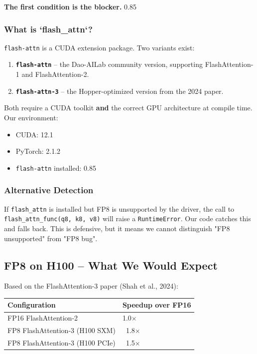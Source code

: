 \textbf{The first condition is the blocker.} 0.85

\subsubsection{What is `flash\_attn`?}

\texttt{flash-attn} is a CUDA extension package. Two variants exist:

\begin{enumerate}
\item \textbf{\texttt{flash-attn}} -- the Dao-AILab community version, supporting
  FlashAttention-1 and FlashAttention-2.
\item \textbf{\texttt{flash-attn-3}} -- the Hopper-optimized version from the 2024 paper.

\end{enumerate}
Both require a CUDA toolkit \textbf{and} the correct GPU architecture at compile 
time. Our environment:

\begin{itemize}
\item CUDA: 12.1
\item PyTorch: 2.1.2
\item \texttt{flash-attn} installed: 0.85

\end{itemize}
\subsubsection{Alternative Detection}

If \texttt{flash\_attn} is installed but FP8 is unsupported by the driver, the call 
to \texttt{flash\_attn\_func(q8, k8, v8)} will raise a \texttt{RuntimeError}. Our code 
catches this and falls back. This is defensive, but it means we cannot 
distinguish "FP8 unsupported" from "FP8 bug".

\subsection{FP8 on H100 -- What We Would Expect}

Based on the FlashAttention-3 paper (Shah et al., 2024):

\begin{table}[H]
\centering
\small
\begin{tabular}{ll}
\toprule
\textbf{Configuration} & \textbf{Speedup over FP16} \\
\midrule
FP16 FlashAttention-2 & 1.0$\times$ \\
FP8 FlashAttention-3 (H100 SXM) & ~1.8$\times$ \\
FP8 FlashAttention-3 (H100 PCIe) & ~1.5$\times$ \\
\bottomrule
\end{tabular}
\end{table}

